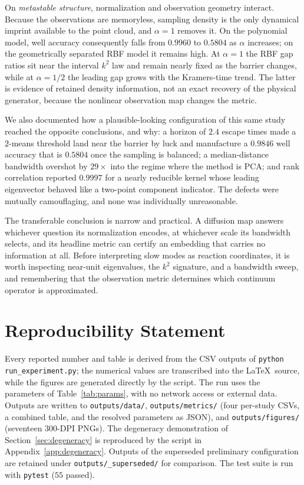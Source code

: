 \documentclass[11pt]{article}
\begin{document}
On \emph{metastable structure}, normalization and observation geometry interact.
Because the observations are memoryless, sampling density is the only dynamical
imprint available to the point cloud, and $\alpha=1$ removes it. On the polynomial
model, well accuracy consequently falls from $0.9960$ to $0.5804$ as $\alpha$
increases; on the geometrically separated RBF model it remains high. At
$\alpha=1$ the RBF gap ratios sit near the interval $k^2$ law and remain nearly
fixed as the barrier changes, while at $\alpha=1/2$ the leading gap grows with the
Kramers-time trend. The latter is evidence of retained density information, not
an exact recovery of the physical generator, because the nonlinear observation
map changes the metric.

We also documented how a plausible-looking configuration of this same study
reached the opposite conclusions, and why: a horizon of $2.4$ escape times made a
$2$-means threshold land near the barrier by luck and manufacture a $0.9846$ well
accuracy that is $0.5804$ once the sampling is balanced; a median-distance
bandwidth overshot by $29\times$ into the regime where the method is PCA; and
rank correlation reported $0.9997$ for a nearly reducible kernel whose leading
eigenvector behaved like a two-point component indicator. The defects were mutually
camouflaging, and none was individually unreasonable.

The transferable conclusion is narrow and practical. A diffusion map answers
whichever question its normalization encodes, at whichever scale its bandwidth
selects, and its headline metric can certify an embedding that carries no
information at all. Before interpreting slow modes as reaction coordinates, it is
worth inspecting near-unit eigenvalues, the $k^2$ signature, and a bandwidth
sweep, and remembering that the observation metric determines which continuum
operator is approximated.

\section*{Reproducibility Statement}

Every reported number and table is derived from the CSV outputs of
\texttt{python run\_experiment.py}; the numerical values are transcribed into the
\LaTeX\ source, while the figures are generated directly by the script. The run
uses the parameters of Table~\ref{tab:params}, with no network access or external
data. Outputs are written to \texttt{outputs/data/}, \texttt{outputs/metrics/}
(four per-study CSVs, a combined table, and the resolved parameters as JSON), and
\texttt{outputs/figures/} (seventeen 300-DPI PNGs). The degeneracy demonstration
of Section~\ref{sec:degeneracy} is reproduced by the script in
Appendix~\ref{app:degeneracy}. Outputs of the superseded preliminary
configuration are retained under \texttt{outputs/\_superseded/} for comparison.
The test suite is run with \texttt{pytest} ($55$ passed).
\end{document}
